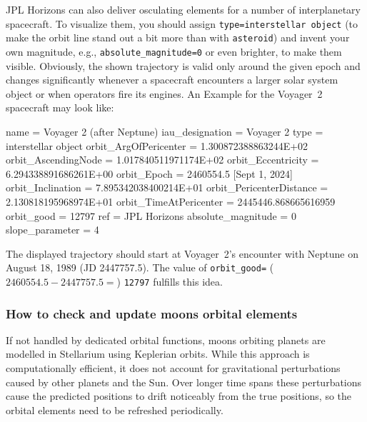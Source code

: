 \noindent JPL Horizons can also deliver osculating elements for a number of interplanetary spacecraft. 
To visualize them, you should assign \texttt{type=interstellar object} 
(to make the orbit line stand out a bit more than with \texttt{asteroid}) 
and invent your own magnitude, e.g., \texttt{absolute\_magnitude=0} or even brighter, to make them visible. 
Obviously, the shown trajectory is valid only around the given epoch and changes significantly whenever a spacecraft 
encounters a larger solar system object or when operators fire its engines. An Example for the Voyager~2 spacecraft may look like:

\begin{configfile}[\scriptsize]
[voyager2]
name                           = Voyager 2 (after Neptune)
iau_designation                = Voyager 2
type                           = interstellar object
orbit_ArgOfPericenter          = 1.300872388863244E+02
orbit_AscendingNode            = 1.017840511971174E+02
orbit_Eccentricity             = 6.294338891686261E+00
orbit_Epoch                    = 2460554.5               [Sept 1, 2024]
orbit_Inclination              = 7.895342038400214E+01
orbit_PericenterDistance       = 2.130818195968974E+01
orbit_TimeAtPericenter         = 2445446.868665616959
orbit_good                     = 12797
ref                            = JPL Horizons 
absolute_magnitude             = 0
slope_parameter                = 4
\end{configfile}

\noindent The displayed trajectory should start at Voyager~2's encounter with Neptune on August 18, 1989 (JD 2447757.5). 
The value of \texttt{orbit\_good=} ($2460554.5-2447757.5 = $) \texttt{12797} fulfills this idea. 

\subsubsection{How to check and update moons orbital elements}
\label{sec:ssystem.ini:MoonsOrbitalElements}

If not handled by dedicated orbital functions, moons orbiting planets are modelled in Stellarium using Keplerian orbits. While this
approach is computationally efficient, it does not account for gravitational perturbations
caused by other planets and the Sun. Over longer time spans these perturbations cause the
predicted positions to drift noticeably from the true positions, so the orbital elements
need to be refreshed periodically.

